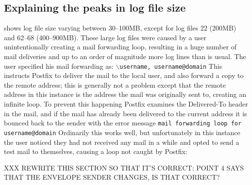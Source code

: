 

\subsection{Explaining the peaks in log file size}

\label{Explaining the peaks in log file size}

 shows log
file size varying between 30--100MB, except for log files 22 (200MB) and
62--68 (400--900MB).  These large log files were caused by a user
unintentionally creating a mail forwarding loop, resulting in a huge number
of mail deliveries and up to an order of magnitude more log lines than is
usual.  The user specified his mail forwarding as: \newline{}
\tab{}\texttt{$\backslash$username, username@domain} \newline{} This
instructs Postfix to deliver the mail to the local user, and also forward a
copy to the remote address; this is generally not a problem except that the
remote address in this instance is the address the mail was originally sent
to, creating an infinite loop.  To prevent this happening Postfix examines
the Delivered-To header in the mail, and if the mail has already been
delivered to the current address it is bounced back to the sender with the
error message \newline{} \tab{} \texttt{mail forwarding loop for
username@domain}\newline{}  Ordinarily this works well, but unfortunately
in this instance the user noticed they had not received any mail in a while
and opted to send a test mail to themselves, causing a loop not caught by
Postfix:

XXX REWRITE THIS SECTION SO THAT IT'S CORRECT\@: POINT 4 SAYS THAT THE
ENVELOPE SENDER CHANGES, IS THAT CORRECT\@?

